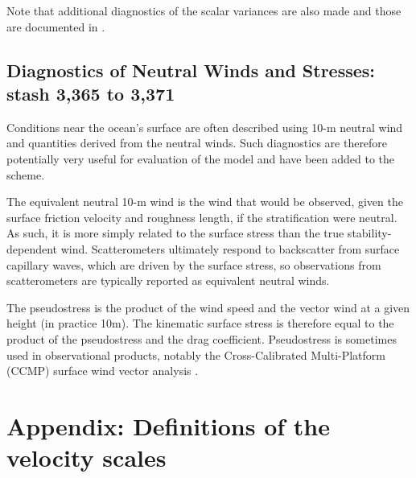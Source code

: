 \documentclass{UMDP_article}
\begin{document}
Note that additional diagnostics of the scalar variances are also made and those
are documented in .

\subsection{Diagnostics of Neutral Winds and Stresses: stash 3,365 to 3,371}
\label{app:neutwind}

Conditions near the ocean's surface are often described using 10-m
neutral wind and quantities derived from the neutral winds. Such
diagnostics are therefore potentially very useful for evaluation of
the model and have been added to the scheme.

The equivalent neutral 10-m wind is the wind that would be observed,
given the surface friction velocity and roughness length, if the
stratification were neutral. As such, it is more simply related to the
surface stress than the true stability-dependent wind. Scatterometers
ultimately respond to backscatter from surface capillary waves, which
are driven by the surface stress, so observations from scatterometers
are typically reported as equivalent neutral winds.

The pseudostress is the product of the wind speed and the vector wind
at a given height (in practice 10m). The kinematic surface stress is
therefore equal to the product of the pseudostress and the drag
coefficient. Pseudostress is sometimes used in observational products,
notably the Cross-Calibrated Multi-Platform (CCMP) surface wind vector
analysis \cite[]{atlas2011}.

 
\section{Appendix: Definitions of the velocity scales}
\label{app:vscales}
 
\end{document}
